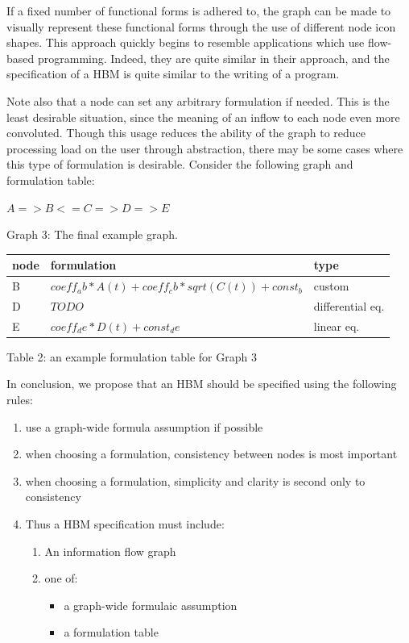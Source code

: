 \documentclass[conference]{IEEEtran}
\begin{document}
If a fixed number of functional forms is adhered to, the graph can be made to visually represent these functional forms through the use of different node icon shapes. 
This approach quickly begins to resemble applications which use flow-based programming. 
Indeed, they are quite similar in their approach, and the specification of a HBM is quite similar to the writing of a program.

Note also that a node can set any arbitrary formulation if needed. 
This is the least desirable situation, since the meaning of an inflow to each node even more convoluted. 
Though this usage reduces the ability of the graph to reduce processing load on the user through abstraction, there may be some cases where this type of formulation is desirable. 
Consider the following graph and formulation table:

$A => B <= C => D => E$

Graph 3: The final example graph.

\begin{centering}
\begin{tabular}{ | l | l | l |}
    \hline
    node & formulation & type \\ \hline
    B & $coeff_ab*A(t) + coeff_cb*sqrt(C(t)) + const_b$ & custom \\ \hline
    D & $ TODO $ & differential eq. \\ \hline
    E & $coeff_de*D(t) + const_de$ & linear eq. \\ \hline
\end{tabular}
Table 2: an example formulation table for Graph 3
\end{centering}

In conclusion, we propose that an HBM should be specified using the following rules:

\begin{enumerate}
  \item use a graph-wide formula assumption if possible
  \item when choosing a formulation, consistency between nodes is most important
  \item when choosing a formulation, simplicity and clarity is second only to consistency
  \item Thus a HBM specification must include:
  \begin{enumerate}
   \item An information flow graph
   \item one of:
    \begin{itemize}
      \item a graph-wide formulaic assumption
      \item a formulation table 
    \end{itemize}
  \end{enumerate}
\end{enumerate}
\end{document}
